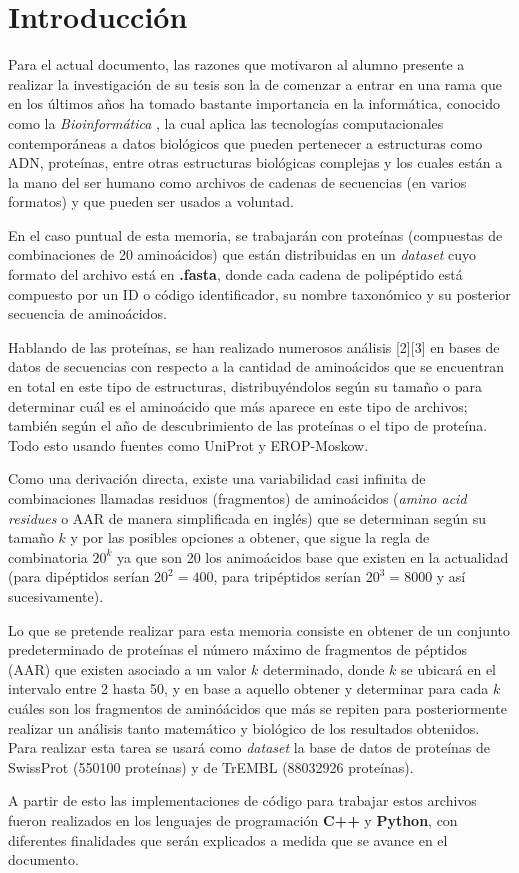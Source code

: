 \chapter*{Introducci\'on}

Para el actual documento, las razones que motivaron al alumno presente a realizar la investigación de su tesis son la de comenzar a 
entrar en una rama que en los últimos años ha tomado bastante importancia en la informática, conocido como la {\textit{Bioinformática}} \cite{bioinformatica}, la cual aplica las tecnologías computacionales contemporáneas a datos biológicos que pueden pertenecer a estructuras como ADN, proteínas, entre otras estructuras biológicas complejas y los cuales están a la mano del ser humano como archivos de cadenas de secuencias (en varios formatos) y que pueden ser usados a voluntad.

En el caso puntual de esta memoria, se trabajarán con proteínas (compuestas de combinaciones de 20 aminoácidos) que están distribuidas en un {\textit{dataset}} cuyo formato del archivo está en \textbf{.fasta}, donde cada cadena de polipéptido está compuesto por un ID o código identificador, su nombre taxonómico y su posterior secuencia de aminoácidos. 



Hablando de las proteínas, se han realizado numerosos análisis [2][3] en bases de datos de secuencias con respecto a la cantidad de aminoácidos que se encuentran en total en este tipo de estructuras, distribuyéndolos según su tamaño o para determinar cuál es el aminoácido que más aparece en este tipo de archivos; también según el año de descubrimiento de las proteínas o el tipo de proteína. Todo esto usando fuentes como UniProt y EROP-Moskow. 

Como una derivación directa, existe una variabilidad casi infinita de combinaciones llamadas residuos (fragmentos) de aminoácidos ({\textit{amino acid residues}} o AAR de manera simplificada en inglés) que se determinan según su tamaño $k$ y por las posibles opciones a obtener, que sigue la regla de combinatoria $20^{k}$ ya que son 20 los animoácidos base que existen en la actualidad (para dipéptidos serían $20^{2} = 400$, para tripéptidos serían $20^{3} = 8000$ y así sucesivamente).

Lo que se pretende realizar para esta memoria consiste en obtener de un conjunto predeterminado de proteínas el número máximo de fragmentos de péptidos (AAR) que existen asociado a un valor $k$ determinado, donde $k$ se ubicará en el intervalo entre 2 hasta 50, y en base a aquello obtener y determinar para cada $k$ cuáles son los fragmentos de aminóácidos que más se repiten para posteriormente realizar un análisis tanto matemático y biológico de los resultados obtenidos. Para realizar esta tarea se usará como \textit{dataset} la base de datos de proteínas de SwissProt (550100 proteínas) y de TrEMBL (88032926 proteínas).

A partir de esto las implementaciones de código para trabajar estos archivos fueron realizados en los lenguajes de programación {\textbf{C++}} y {\textbf{Python}}, con diferentes finalidades que serán explicados a medida que se avance en el documento.